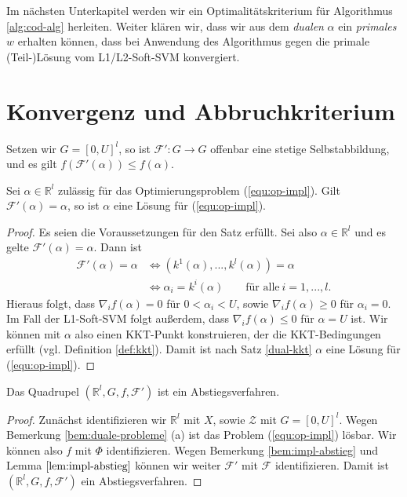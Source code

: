 Im nächsten Unterkapitel werden wir ein Optimalitätskriterium für Algorithmus \ref{alg:cod-alg} herleiten. Weiter klären wir, dass wir aus dem \emph{dualen} $\alpha$ ein \emph{primales} $w$ erhalten können, dass bei Anwendung des Algorithmus gegen die primale (Teil-)Lösung vom L1/L2-Soft-SVM konvergiert.

\section{Konvergenz und Abbruchkriterium}

\begin{bemerkung}\label{bem:impl-abstieg}
	Setzen wir $G = [0,U]^l$, so ist $\mathcal{F}':G \rightarrow G$ offenbar eine stetige Selbstabbildung, und es gilt $f(\mathcal{F}'(\alpha)) \leq f(\alpha)$.
\end{bemerkung}

\begin{lemma}\label{lem:impl-abstieg}
	Sei $\alpha \in \mathbb{R}^l$ zulässig für das Optimierungsproblem (\ref{equ:op-impl}). Gilt $\mathcal{F}'(\alpha) = \alpha$, so ist $\alpha$ eine Lösung für (\ref{equ:op-impl}).
\end{lemma}
\begin{proof}
Es seien die Voraussetzungen für den Satz erfüllt. Sei also $\alpha \in \mathbb{R}^l$ und es gelte $\mathcal{F}'(\alpha) = \alpha$.  Dann ist 
$$
\begin{aligned}
\mathcal{F}'(\alpha) = \alpha & \Leftrightarrow (k^1(\alpha),...,k^l(\alpha)) = \alpha \\
& \Leftrightarrow \alpha_i = k^i(\alpha) \qquad \text{für alle} \ i = 1,...,l.
\end{aligned}
$$ 
Hieraus folgt, dass $\nabla_i f(\alpha) = 0$ für $0 < \alpha_i < U$, sowie $\nabla_i f(\alpha) \geq 0$ für $\alpha_i = 0$. Im Fall der L1-Soft-SVM folgt außerdem, dass $\nabla_i f(\alpha) \leq 0$ für $\alpha = U$ ist. Wir können mit $\alpha$ also einen KKT-Punkt konstruieren, der die KKT-Bedingungen erfüllt (vgl. Definition \ref{def:kkt}). Damit ist nach Satz \ref{dual-kkt} $\alpha$ eine Lösung für (\ref{equ:op-impl}).
\end{proof}

\begin{lemma}\label{lem:abstg-impl}
	Das Quadrupel $(\mathbb{R}^l, G, f, \mathcal{F}')$ ist ein Abstiegsverfahren.
\end{lemma}
\begin{proof}
Zunächst identifizieren wir $\mathbb{R}^l$ mit $X$, sowie $\mathcal{Z}$ mit $G=[0,U]^l$.
Wegen Bemerkung	\ref{bem:duale-probleme} (a) ist das Problem (\ref{equ:op-impl}) lösbar. Wir können also $f$ mit $\Phi$ identifizieren. Wegen Bemerkung \ref{bem:impl-abstieg} und Lemma $\ref{lem:impl-abstieg}$ können wir weiter $\mathcal{F}'$ mit $\mathcal{F}$ identifizieren. Damit ist $(\mathbb{R}^l, G, f, \mathcal{F}')$ ein Abstiegsverfahren.
\end{proof}

